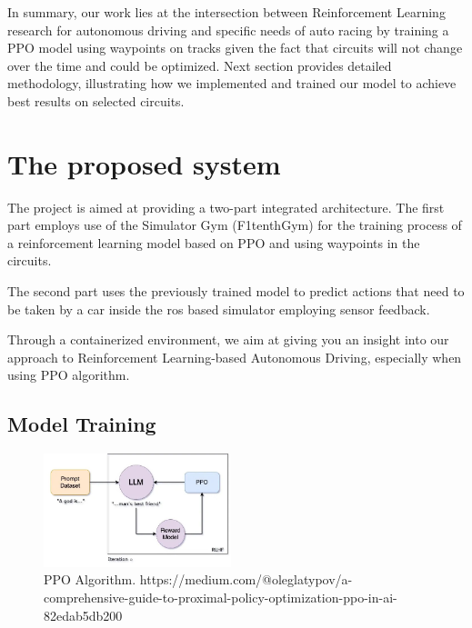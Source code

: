 \documentclass[conference]{IEEEtran}
\begin{document}
In summary, our work lies at the intersection between Reinforcement Learning research for autonomous driving and specific needs of auto racing by training a PPO model using  waypoints on tracks given the fact that circuits will not change over the time and could be optimized.
%
Next section provides detailed methodology, illustrating how we implemented and trained our model to achieve best results on selected circuits.

%
%
%
\section{The proposed system}





The project is aimed at providing a two-part integrated architecture. The first part employs use of the Simulator Gym (F1tenthGym) \cite{F1tenthGym} for the training process of a reinforcement learning model based on PPO \cite{PPOOpenAI} and using waypoints in the circuits.

The second part uses the previously trained model to predict actions that need to be taken by a car inside the ros based simulator employing sensor feedback.

Through a containerized environment, we aim at giving you an insight into our approach to Reinforcement Learning-based Autonomous Driving, especially when using PPO algorithm.

%
%
%
\subsection{Model Training}

\begin{figure}
    \centering
    \includegraphics[width=0.485\textwidth]{img/ppo.jpg}
    \caption{PPO Algorithm. https://medium.com/@oleglatypov/a-comprehensive-guide-to-proximal-policy-optimization-ppo-in-ai-82edab5db200}
    \label{fig:ppo}
\end{figure}
\end{document}
